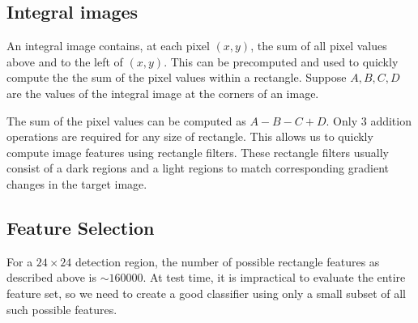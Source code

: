 \documentclass{math}
\begin{document}
\subsection*{Integral images}
An integral image contains, at each pixel \( (x,y) \), the sum of all pixel
values above and to the left of \( (x,y) \). This can be precomputed and used to
quickly compute the the sum of the pixel values within a rectangle. Suppose
\( A,B,C,D \) are the values of the integral image at the corners of an image.
\begin{center}
\end{center}
The sum of the pixel values can be computed as \( A-B-C+D \). Only 3 addition
operations are required for any size of rectangle. This allows us to quickly
compute image features using rectangle filters. These rectangle filters usually
consist of a dark regions and a light regions to match corresponding
gradient changes in the target image.
\begin{center}
\end{center}

\subsection*{Feature Selection}
For a \( 24\times24 \) detection region, the number of possible rectangle
features as described above is \( \sim160000\). At test time, it is impractical
to evaluate the entire feature set, so we need to create a good classifier using
only a small subset of all such possible features.
\end{document}
